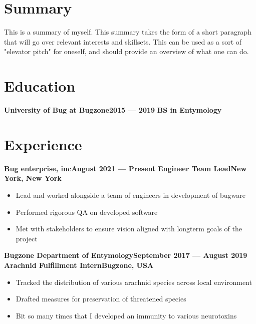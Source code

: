 \documentclass[a4paper, oneside, final]{scrartcl}
\begin{document}
\begin{center}
{\fontsize{36}{36}
\selectfont
\scshape
{}
}\vspace{1.5cm}
\section{Summary}
This is a summary of myself. This summary takes the form of a short paragraph that will go over relevant interests and skillsets. This can be used as a sort of "elevator pitch" for oneself, and should provide an overview of what one can do.\section{Education}
\begin{flushleft}
\textbf{University of Bug at Bugzone\hfill 2015 --- 2019}
\newline
\textbf{BS in Entymology}
\end{flushleft}
\vspace{12pt}
\section{Experience}
\begin{flushleft}
\textbf{Bug enterprise, inc\hfill August 2021 --- Present}
\newline
\textbf{Engineer Team Lead\hfill New York, New York
}
\end{flushleft}
\begin{multicols}{2}
\begin{itemize}
\item Lead and worked alongside a team of engineers in development of bugware
\item Performed rigorous QA on developed software
\item Met with stakeholders to ensure vision aligned with longterm goals of the project
\end{itemize}
\end{multicols}
\vspace{12pt}
\begin{flushleft}
\textbf{Bugzone Department of Entymology\hfill September 2017 --- August 2019}
\newline
\textbf{Arachnid Fulfillment Intern\hfill Bugzone, USA
}
\end{flushleft}
\begin{multicols}{2}
\begin{itemize}
\item Tracked the distribution of various arachnid species across local environment
\item Drafted measures for preservation of threatened species
\item Bit so many times that I developed an immunity to various neurotoxins
\end{itemize}
\end{multicols}
\vspace{12pt}

\end{center}
\end{document}
